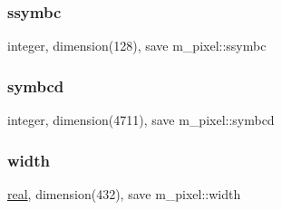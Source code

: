 \subsubsection{\texorpdfstring{ssymbc}{ssymbc}}
{\footnotesize\ttfamily integer, dimension(128), save m\+\_\+pixel\+::ssymbc\hspace{0.3cm}{\ttfamily [private]}}

\mbox{\label{namespacem__pixel_a3da3613bd8dfa6a15b7d0aa3db1f9eb5}} 
\subsubsection{\texorpdfstring{symbcd}{symbcd}}
{\footnotesize\ttfamily integer, dimension(4711), save m\+\_\+pixel\+::symbcd\hspace{0.3cm}{\ttfamily [private]}}

\mbox{\label{namespacem__pixel_abf266872f93a04af39d2903fb20d2a0d}} 
\subsubsection{\texorpdfstring{width}{width}}
{\footnotesize\ttfamily \hyperlink{read__watch_83_8txt_abdb62bde002f38ef75f810d3a905a823}{real}, dimension(432), save m\+\_\+pixel\+::width\hspace{0.3cm}{\ttfamily [private]}}

